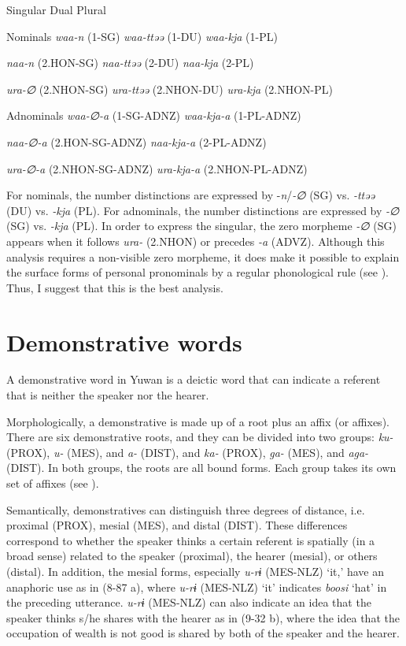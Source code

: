   Singular  Dual  Plural

Nominals  \textit{waa-n}  (1-SG)  \textit{waa-ttəə}  (1-DU)  \textit{waa-kja}  (1-PL)

  \textit{naa-n}   (2.HON-SG)  \textit{naa-ttəə}  (2-DU)  \textit{naa-kja}  (2-PL)

  \textit{ura-∅}   (2.NHON-SG)  \textit{ura-ttəə}  (2.NHON-DU)  \textit{ura-kja}  (2.NHON-PL)

Adnominals  \textit{waa-∅-a}   (1-SG-ADNZ)    \textit{waa-kja-a}  (1-PL-ADNZ)  

  \textit{naa-∅-a}  (2.HON-SG-ADNZ)    \textit{naa-kja-a}  (2-PL-ADNZ)  

  \textit{ura-∅-a}   (2.NHON-SG-ADNZ)    \textit{ura-kja-a}  (2.NHON-PL-ADNZ)  

For nominals, the number distinctions are expressed by -\textit{n}/\textit{{}-∅} (SG) vs. \textit{{}-ttəə} (DU) vs. \textit{{}-kja} (PL). For adnominals, the number distinctions are expressed by \textit{{}-∅} (SG) vs. \textit{{}-kja} (PL). In order to express the singular, the zero morpheme \textit{{}-∅} (SG) appears when it follows \textit{ura-} (2.NHON) or precedes \textit{{}-a} (ADVZ). Although this analysis requires a non-visible zero morpheme, it does make it possible to explain the surface forms of personal pronominals by a regular phonological rule (see ). Thus, I suggest that this is the best analysis.

\section{Demonstrative words}

A demonstrative word in Yuwan is a deictic word that can indicate a referent that is neither the speaker nor the hearer.

  Morphologically, a demonstrative is made up of a root plus an affix (or affixes). There are six demonstrative roots, and they can be divided into two groups:  \textit{ku-} (PROX), \textit{u-} (MES), and \textit{a-} (DIST), and  \textit{ka-} (PROX), \textit{ga-} (MES), and \textit{aga-} (DIST). In both groups, the roots are all bound forms. Each group takes its own set of affixes (see ).

  Semantically, demonstratives can distinguish three degrees of distance, i.e. proximal (PROX), mesial (MES), and distal (DIST). These differences correspond to whether the speaker thinks a certain referent is spatially (in a broad sense) related to the speaker (proximal), the hearer (mesial), or others (distal). In addition, the mesial forms, especially \textit{u-rɨ} (MES-NLZ) ‘it,’ have an anaphoric use as in (8-87 a), where \textit{u-rɨ} (MES-NLZ) ‘it’ indicates \textit{boosi} ‘hat’ in the preceding utterance. \textit{u-rɨ} (MES-NLZ) can also indicate an idea that the speaker thinks s/he shares with the hearer as in (9-32 b), where the idea that the occupation of wealth is not good is shared by both of the speaker and the hearer.

